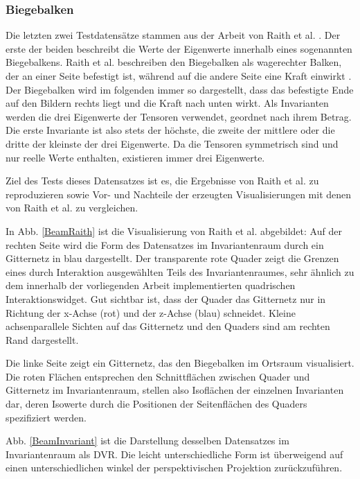 \documentclass[a4paper,fontsize=12pt,toc=bib,halfparskip]{scrartcl}
\begin{document}
\subsubsection{Biegebalken}
Die letzten zwei Testdatens\"atze stammen aus der Arbeit von Raith et al. \cite{raith2019tensor}. Der erste der beiden beschreibt die Werte der Eigenwerte innerhalb eines sogenannten Biegebalkens. Raith et al. beschreiben den Biegebalken als wagerechter Balken, der an einer Seite befestigt ist, w\"ahrend auf die andere Seite eine Kraft einwirkt \cite[S.~1128]{raith2019tensor}. Der Biegebalken wird im folgenden immer so dargestellt, dass das befestigte Ende auf den Bildern rechts liegt und die Kraft nach unten wirkt. Als Invarianten werden die drei Eigenwerte der Tensoren verwendet, geordnet nach ihrem Betrag. Die erste Invariante ist also stets der h\"ochste, die zweite der mittlere oder die dritte der kleinste der drei Eigenwerte. Da die Tensoren symmetrisch sind und nur reelle Werte enthalten, existieren immer drei Eigenwerte.

Ziel des Tests dieses Datensatzes ist es, die Ergebnisse von Raith et al. zu reproduzieren sowie Vor- und Nachteile der erzeugten Visualisierungen mit denen von Raith et al. zu vergleichen.

In Abb. \ref{BeamRaith} ist die Visualisierung von Raith et al. abgebildet: Auf der rechten Seite wird die Form des Datensatzes im Invariantenraum durch ein Gitternetz in blau dargestellt. Der transparente rote Quader zeigt die Grenzen eines durch Interaktion ausgew\"ahlten Teils des Invariantenraumes, sehr \"ahnlich zu dem innerhalb der vorliegenden Arbeit implementierten quadrischen Interaktionswidget. Gut sichtbar ist, dass der Quader das Gitternetz nur in Richtung der x-Achse (rot) und der z-Achse (blau) schneidet. Kleine achsenparallele Sichten auf das Gitternetz und den Quaders sind am rechten Rand dargestellt.

Die linke Seite zeigt ein Gitternetz, das den Biegebalken im Ortsraum visualisiert. Die roten Fl\"achen entsprechen den Schnittfl\"achen zwischen Quader und Gitternetz im Invariantenraum, stellen also Isofl\"achen der einzelnen Invarianten dar, deren Isowerte durch die Positionen der Seitenfl\"achen des Quaders spezifiziert werden.

Abb. \ref{BeamInvariant} ist die Darstellung desselben Datensatzes im Invariantenraum als DVR. Die leicht unterschiedliche Form ist \"uberweigend auf einen unterschiedlichen winkel der perspektivischen Projektion zur\"uckzuf\"uhren. 
\end{document}
